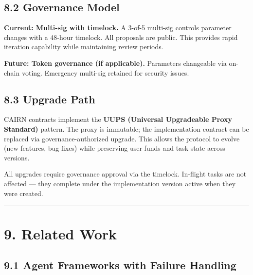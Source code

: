 \documentclass[
  10pt,
]{article}
\begin{document}
\hypertarget{governance-model}{%
\subsection{8.2 Governance Model}\label{governance-model}}

\textbf{Current: Multi-sig with timelock.} A 3-of-5 multi-sig controls
parameter changes with a 48-hour timelock. All proposals are public.
This provides rapid iteration capability while maintaining review
periods.

\textbf{Future: Token governance (if applicable).} Parameters changeable
via on-chain voting. Emergency multi-sig retained for security issues.

\hypertarget{upgrade-path}{%
\subsection{8.3 Upgrade Path}\label{upgrade-path}}

CAIRN contracts implement the \textbf{UUPS (Universal Upgradeable Proxy
Standard)} pattern. The proxy is immutable; the implementation contract
can be replaced via governance-authorized upgrade. This allows the
protocol to evolve (new features, bug fixes) while preserving user funds
and task state across versions.

All upgrades require governance approval via the timelock. In-flight
tasks are not affected --- they complete under the implementation
version active when they were created.

\begin{center}\rule{0.5\linewidth}{0.5pt}\end{center}

\hypertarget{related-work}{%
\section{9. Related Work}\label{related-work}}

\hypertarget{agent-frameworks-with-failure-handling}{%
\subsection{9.1 Agent Frameworks with Failure
Handling}\label{agent-frameworks-with-failure-handling}}
\end{document}
